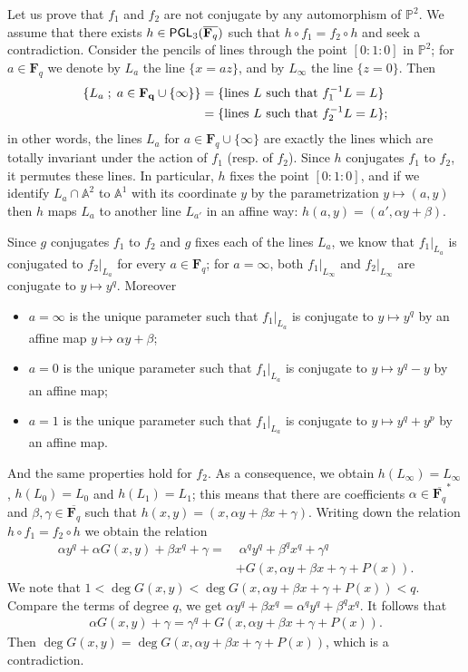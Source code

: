 \documentclass[reqno,oneside,12pt]{amsart}
\theoremstyle{plain}
\theoremstyle{definition}
\def\bfF{{\mathbf{F}}}
\newcommand{\bbA}{{\mathbb{A}}}
\def\P{\mathbb{P}}
\def\PGL{{\sf{PGL}}}
\begin{document}
{{{{Let us prove that $f_1$ and $f_2$ are not conjugate by any automorphism of $\P^2$.
We assume that there exists $h\in \PGL_3(\overline{\bfF_q})$ such that $h\circ f_1=f_2\circ h$ and seek a contradiction.
Consider the pencils of lines through the point $[0:1:0]$ in $\P^2$; for $a\in \bfF_q$ we denote by 
$L_a$ the line $\{x=az\}$, and by $L_\infty$ the line $\{ z=0\}$. 
Then 
\begin{align}\{L_a \; ; \; a\in \bf F_q\cup \{\infty\}\} & = \{{\text{lines}} \ L \ {\text{such that}}\  f_1^{-1}L=L\} \\
&  =\{{\text{lines}} \ L \ {\text{such that}}\ f_2^{-1}L=L\};
\end{align}                  
in other words, the lines $L_a$ for $a\in \bfF_q\cup\{\infty\}$ are exactly the lines which are totally invariant under
the action of $f_1$ (resp. of $f_2$).
Since $h$ conjugates $f_1$ to $f_2$, it permutes these lines. In particular, $h$ fixes the point $[0:1:0]$, and if 
we identify $L_a\cap \bbA^2$ to $\bbA^1$ with its coordinate $y$ by the parametrization $y\mapsto (a,y) $ then 
$h$ maps $L_a$ to another line $L_{a'}$ in an affine way: $h(a,y)=(a',\alpha y +\beta)$.

Since $g$ conjugates $f_1$ to $f_2$ and $g$ fixes each of the lines $L_a$, we know that $f_1|_{L_a}$ is conjugated to $f_2|_{L_a}$
for every  $a\in \bfF_q$; for $a=\infty$, both $f_1|_{L_\infty}$ and $f_2|_{L_\infty}$ are conjugate to $y\mapsto y^q$. Moreover
\begin{itemize}
\item $a=\infty$ is the unique parameter  such that $f_1|_{L_a}$  is conjugate to $y\mapsto y^q$ by an affine map $y \mapsto \alpha y + \beta$;
\item $a=0$ is the unique parameter such that $f_1|_{L_a}$ is conjugate to $y\mapsto y^q-y$ by an affine map;
\item $a=1$  is the unique parameter such that $f_1|_{L_a}$ is conjugate to $y\mapsto y^q+y^p$ by an affine map.
\end{itemize}
And the same properties hold for $f_2$.
As a consequence, we obtain $h(L_{\infty})=L_{\infty}$, $h(L_0)=L_0$ and $h(L_1)=L_1$; this means that there are coefficients  $\alpha \in {\overline{\bfF_q}}^*$ and $\beta, \gamma\in {\overline{\bfF_q}}$ such that 
$h(x,y)= (x, \alpha y+\beta x+\gamma)$.
Writing down the relation $h\circ f_1=f_2\circ h$ we obtain the relation
\begin{align}
\alpha y^q+\alpha G(x,y)+\beta x^q+\gamma = &\;  \alpha^q y^q+\beta^qx^q+\gamma^q\\
&+ G(x, \alpha y+\beta x+\gamma +P(x)).
\end{align}
We note that $1<\deg G(x,y)<\deg G(x, \alpha y+\beta x+\gamma +P(x))<q$.
Compare the terms of degree $q$, we get $\alpha y^q+\beta x^q=\alpha^q y^q+\beta^qx^q.$
It follows that 
\begin{align}
\alpha G(x,y)+\gamma =  \gamma^q+ G(x, \alpha y+\beta x+\gamma +P(x)).
\end{align}
Then $\deg G(x,y)=\deg G(x, \alpha y+\beta x+\gamma +P(x))$, which is a contradiction.


}}}}
\end{document}
